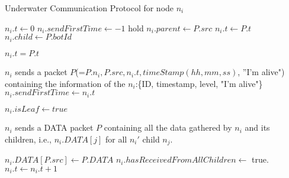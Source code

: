 \documentclass[11pt,letter]{article}
\begin{document}
\begin{algorithm}
\caption{Underwater Communication Protocol for node $n_i$}\label{algo:tdma-1}

\begin{algorithmic}[1]

\STATE $n_i.t \gets 0$ %
\STATE $n_i.sendFirstTime \gets -1$
        \STATE hold
    \ENDWHILE
	       \STATE $n_i.parent \gets P.src$  %
            \STATE $n_i.t \gets P.t$
	       \STATE $n_i.child \gets P.botId$  %
	
	    \ENDIF
        \STATE $n_i.t=P.t$
	  \ENDIF
	
	\ELSE  %
	     \STATE $n_i$ sends a packet $P$(=$P.n_i, P.src, n_i.t, timeStamp(hh, mm,ss)$, ''I'm alive") containing the information of the $n_i$:\{ID, timestamp, level, "I'm alive"\}
             \STATE $n_i.sendFirstTime \gets n_i.t$
         \ENDIF
	  \ENDIF
	\ENDIF

        \STATE $n_i.isLeaf \gets true$
    \ENDIF

    \STATE $n_i$ sends a DATA packet $P$ containing all the data gathered by $n_i$ and its children, i.e., $n_i.DATA[j]$ for all $n_i'$ child $n_j$.

  \ELSE
      \STATE $n_i.DATA[P.src] \gets P.DATA$
        \STATE $n_i.hasReceivedFromAllChildren \gets$ true.
      \ENDIF
    \ENDIF
  \ENDIF
  \STATE $n_i.t \gets n_i.t + 1$
\ENDWHILE
\ENDIF
\end{algorithmic}
\end{algorithm}
\end{document}

